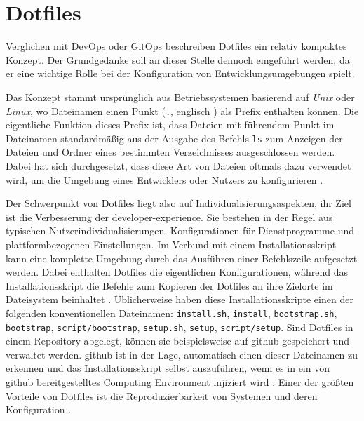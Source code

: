 \section{Dotfiles}
\label{sec:03-04_dotfiles}

Verglichen mit \hyperref[sec:03-01_devops]{DevOps} oder \hyperref[sec:03-03_gitops]{GitOps} beschreiben Dotfiles ein relativ kompaktes Konzept. Der Grundgedanke soll an dieser Stelle dennoch eingeführt werden, da er eine wichtige Rolle bei der Konfiguration von Entwicklungsumgebungen spielt.

Das Konzept stammt ursprünglich aus Betriebssystemen basierend auf \textit{Unix} oder \textit{Linux}, wo Dateinamen einen Punkt (\texttt{.}, englisch ) als Prefix enthalten können. Die eigentliche Funktion dieses Prefix ist, dass Dateien mit führendem Punkt im Dateinamen standardmäßig aus der Ausgabe des Befehls \texttt{ls} zum Anzeigen der Dateien und Ordner eines bestimmten Verzeichnisses ausgeschlossen werden. Dabei hat sich durchgesetzt, dass diese Art von Dateien oftmals dazu verwendet wird, um die Umgebung eines Entwicklers oder Nutzers zu konfigurieren \cite{029:Connecting-the-Dotfiles}.

Der Schwerpunkt von Dotfiles liegt also auf Individualisierungsaspekten, ihr Ziel ist die Verbesserung der \Gls{developer-experience}. Sie bestehen in der Regel aus typischen Nutzerindividualisierungen, Konfigurationen für Dienstprogramme und plattformbezogenen Einstellungen. Im Verbund mit einem Installationsskript kann eine komplette Umgebung durch das Ausführen einer Befehlszeile aufgesetzt werden. Dabei enthalten Dotfiles die eigentlichen Konfigurationen, während das Installationsskript die Befehle zum Kopieren der Dotfiles an ihre Zielorte im Dateisystem beinhaltet \cite{203:Dev-Environment-as-a-Code-with-DevContainers-Dotfiles-and-GitHub-Codespaces}. Üblicherweise haben diese Installationsskripte einen der folgenden konventionellen Dateinamen: \texttt{install.sh}, \texttt{install}, \texttt{bootstrap.sh}, \texttt{bootstrap}, \texttt{script/bootstrap}, \texttt{setup.sh}, \texttt{setup}, \texttt{script/setup}. Sind Dotfiles in einem Repository abgelegt, können sie beispielsweise auf \Gls{github} gespeichert und verwaltet werden. \Gls{github} ist in der Lage, automatisch einen dieser Dateinamen zu erkennen und das Installationsskript selbst auszuführen, wenn es in ein von \Gls{github} bereitgestelltes Computing Environment injiziert wird \cite{304:Personalizing-GitHub-Codespaces-for-your-Account}. Einer der größten Vorteile von Dotfiles ist die Reproduzierbarkeit von Systemen und deren Konfiguration \cite{029:Connecting-the-Dotfiles}.

